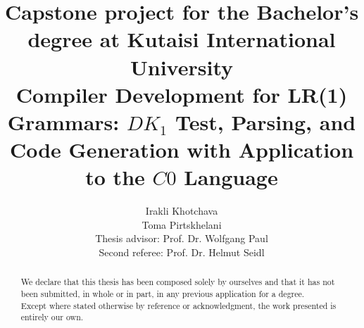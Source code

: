 \documentclass[11pt]{report}
\title{{\large Capstone project for the Bachelor’s degree at Kutaisi International University} \\ \vspace{50pt} Compiler Development for LR(1) Grammars: \(DK_{1}\) Test, Parsing, and Code Generation with Application to the \(C0\) Language}
\author{Irakli Khotchava\\Toma Pirtskhelani \vspace{30pt}\\ Thesis advisor: Prof. Dr. Wolfgang Paul \\
Second referee: Prof. Dr. Helmut Seidl}
\date{}
\begin{document}
    \maketitle
    \tableofcontents

    \renewcommand{\abstractname}{Declaration}
    \begin{abstract}

        We declare that this thesis has been composed solely by ourselves and that it has not been submitted, in whole or in part, in any previous application for a degree. \\

        Except where stated otherwise by reference or acknowledgment, the work presented is entirely our own.
    \end{abstract}

    \renewcommand{\abstractname}{Summary}
\end{document}
